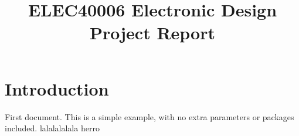 \documentclass{report}
\begin{document}
\title{ELEC40006 Electronic Design Project Report}
\author{}
\section{Introduction}

First document. This is a simple example, with no 
extra parameters or packages included.
lalalalalala
herro
\end{document}

